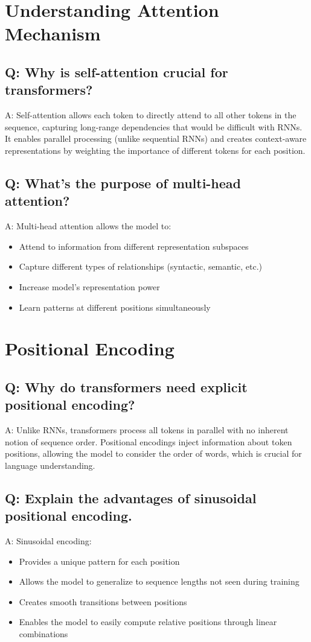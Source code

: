 \section*{Understanding Attention Mechanism}

\subsection*{Q: Why is self-attention crucial for transformers?}
A: Self-attention allows each token to directly attend to all other tokens in the sequence, capturing long-range dependencies that would be difficult with RNNs. It enables parallel processing (unlike sequential RNNs) and creates context-aware representations by weighting the importance of different tokens for each position.

\subsection*{Q: What's the purpose of multi-head attention?}
A: Multi-head attention allows the model to:
\begin{itemize}
    \item Attend to information from different representation subspaces
    \item Capture different types of relationships (syntactic, semantic, etc.)
    \item Increase model's representation power
    \item Learn patterns at different positions simultaneously
\end{itemize}

\section*{Positional Encoding}

\subsection*{Q: Why do transformers need explicit positional encoding?}
A: Unlike RNNs, transformers process all tokens in parallel with no inherent notion of sequence order. Positional encodings inject information about token positions, allowing the model to consider the order of words, which is crucial for language understanding.

\subsection*{Q: Explain the advantages of sinusoidal positional encoding.}
A: Sinusoidal encoding:
\begin{itemize}
    \item Provides a unique pattern for each position
    \item Allows the model to generalize to sequence lengths not seen during training
    \item Creates smooth transitions between positions
    \item Enables the model to easily compute relative positions through linear combinations
\end{itemize}

